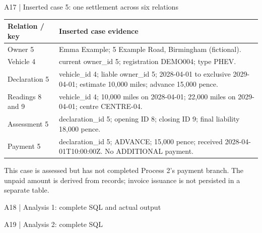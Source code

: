 \begin{frame}{A17 | Inserted case 5: one settlement across six relations}
\small
\begin{tabularx}{\textwidth}{@{}p{}X@{}}\toprule
\textbf{Relation / key} & \textbf{Inserted case evidence}\\\midrule
Owner 5 & Emma Example; 5 Example Road, Birmingham (fictional).\\
Vehicle 4 & current owner\_id 5; registration DEMO004; type PHEV.\\
Declaration 5 & vehicle\_id 4; liable owner\_id 5; 2028-04-01 to exclusive 2029-04-01; estimate 10,000 miles; advance 15,000 pence.\\
Readings 8 and 9 & vehicle\_id 4; 10,000 miles on 2028-04-01; 22,000 miles on 2029-04-01; centre CENTRE-04.\\
Assessment 5 & declaration\_id 5; opening ID 8; closing ID 9; final liability 18,000 pence.\\
Payment 5 & declaration\_id 5; ADVANCE; 15,000 pence; received 2028-04-01T10:00:00Z. No ADDITIONAL payment.\\\bottomrule
\end{tabularx}\par
\medskip
This case is assessed but has not completed Process 2's payment branch. The unpaid amount is derived from records; invoice issuance is not persisted in a separate table.
\end{frame}

\begin{frame}[fragile]{A18 | Analysis 1: complete SQL and actual output}

\end{frame}

\begin{frame}[fragile]{A19 | Analysis 2: complete SQL}

\end{frame}

